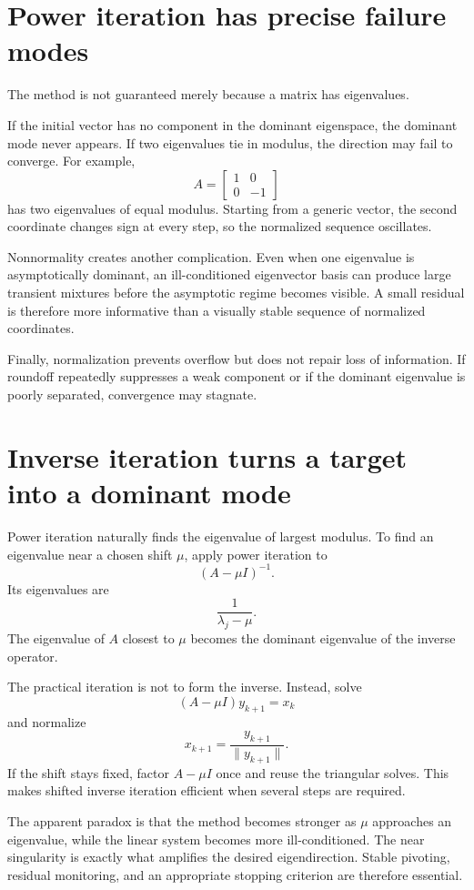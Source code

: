 \section{Power iteration has precise failure modes}

The method is not guaranteed merely because a matrix has eigenvalues.

If the initial vector has no component in the dominant eigenspace, the dominant mode never appears.  If two eigenvalues tie in modulus, the direction may fail to converge.  For example,
\[
  A=
  \begin{bmatrix}
    1&0\\
    0&-1
  \end{bmatrix}
\]
has two eigenvalues of equal modulus.  Starting from a generic vector, the second coordinate changes sign at every step, so the normalized sequence oscillates.

Nonnormality creates another complication.  Even when one eigenvalue is asymptotically dominant, an ill-conditioned eigenvector basis can produce large transient mixtures before the asymptotic regime becomes visible.  A small residual is therefore more informative than a visually stable sequence of normalized coordinates.

Finally, normalization prevents overflow but does not repair loss of information.  If roundoff repeatedly suppresses a weak component or if the dominant eigenvalue is poorly separated, convergence may stagnate.

\section{Inverse iteration turns a target into a dominant mode}

Power iteration naturally finds the eigenvalue of largest modulus.  To find an eigenvalue near a chosen shift \(\mu\), apply power iteration to
\[
  (A-\mu I)^{-1}.
\]
Its eigenvalues are
\[
  \frac1{\lambda_j-\mu}.
\]
The eigenvalue of \(A\) closest to \(\mu\) becomes the dominant eigenvalue of the inverse operator.

The practical iteration is not to form the inverse.  Instead, solve
\[
  (A-\mu I)y_{k+1}=x_k
\]
and normalize
\[
  x_{k+1}=\frac{y_{k+1}}{\|y_{k+1}\|}.
\]
If the shift stays fixed, factor \(A-\mu I\) once and reuse the triangular solves.  This makes shifted inverse iteration efficient when several steps are required.

The apparent paradox is that the method becomes stronger as \(\mu\) approaches an eigenvalue, while the linear system becomes more ill-conditioned.  The near singularity is exactly what amplifies the desired eigendirection.  Stable pivoting, residual monitoring, and an appropriate stopping criterion are therefore essential.

